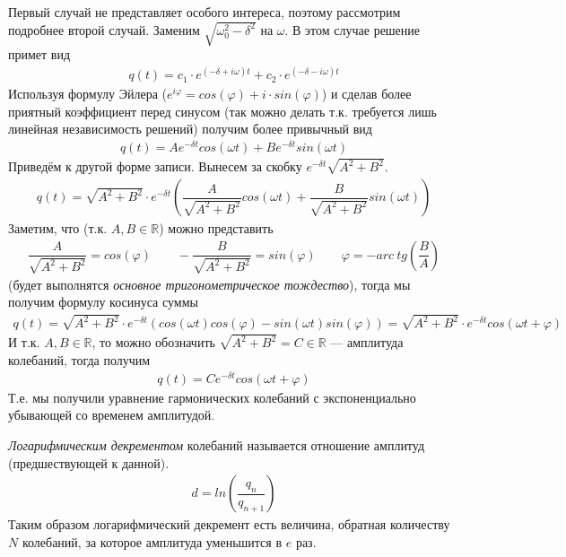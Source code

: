 \documentclass[a4paper, usenames, dvipsnames]{article}
\begin{document}
Первый случай не представляет особого интереса,
поэтому рассмотрим подробнее второй случай.
Заменим $\sqrt{\omega_0^2 - \delta^2}$ на $\omega$. В этом случае решение примет вид
\begin{gather*}
    q(t) = c_1 \cdot e^{(-\delta + i\omega)t} + c_2 \cdot e^{(-\delta - i\omega)t}
\end{gather*}
Используя формулу Эйлера
($e^{i\varphi} = cos(\varphi) + i \cdot sin(\varphi)$)
и сделав более приятный коэффициент перед синусом (так можно делать т.к.
требуется лишь линейная независимость решений) получим более привычный вид
\begin{gather*}
    q(t) = A e^{-\delta t}cos(\omega t) + B e^{-\delta t} sin(\omega t)
\end{gather*}
Приведём к другой форме записи. Вынесем за скобку $e^{-\delta t} \sqrt{A^2 + B^2}$.
\begin{gather*}
    q(t) = \sqrt{A^2 + B^2} \cdot e^{-\delta t} \left( \dfrac{A}{\sqrt{A^2 + B^2}} cos(\omega t) + \dfrac{B}{\sqrt{A^2 + B^2}} sin(\omega t) \right)
\end{gather*}
Заметим, что (т.к. $A, B \in \mathbb{R}$) можно представить
\begin{gather*}
    \dfrac{A}{\sqrt{A^2 + B^2}} = cos(\varphi) \hspace{2em} -\dfrac{B}{\sqrt{A^2 + B^2}} = sin(\varphi) \hspace{2em} \varphi = - arc\ tg\left(\dfrac{B}{A}\right)
\end{gather*}
(будет выполнятся {\it основное тригонометрическое тождество}), тогда мы получим формулу косинуса суммы
\begin{gather*}
    q(t) = \sqrt{A^2 + B^2} \cdot e^{-\delta t} (cos(\omega t) cos(\varphi) - sin(\omega t) sin(\varphi)) = \sqrt{A^2 + B^2} \cdot e^{-\delta t} cos(\omega t + \varphi)
\end{gather*}
И т.к. $A, B \in \mathbb{R}$, то можно обозначить $\sqrt{A^2 + B^2} = C \in \mathbb{R}$ --- амплитуда колебаний,
тогда получим
\begin{gather*}
    q(t) = C e^{-\delta t} cos(\omega t + \varphi)
\end{gather*}
Т.е. мы получили уравнение гармонических колебаний
с экспоненциально убывающей со временем амплитудой.

{\it Логарифмическим декрементом} колебаний называется отношение амплитуд
(предшествующей к данной).
\begin{gather*}
    d = ln\left(\dfrac{q_n}{q_{n + 1}}\right)
\end{gather*}
Таким образом логарифмический декремент есть величина,
обратная количеству $N$ колебаний, за которое амплитуда уменьшится в $e$ раз.
\end{document}
